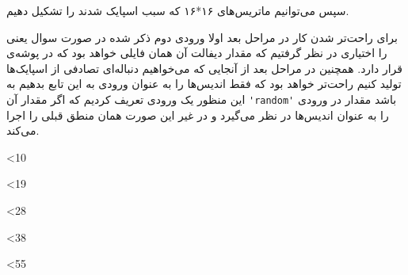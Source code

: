\documentclass[12pt,onecolumn,a4paper,fleqn]{article}
\begin{document}
سپس می‌توانیم ماتریس‌های ۱۶*۱۶ که سبب اسپایک شدند را تشکیل دهیم.

برای راحت‌تر شدن کار در مراحل بعد اولا ورودی دوم ذکر شده در صورت سوال یعنی  را اختیاری در نظر گرفتیم که مقدار دیفالت آن همان فایلی خواهد بود که در پوشه‌ی  قرار دارد. همچنین در مراحل بعد از آنجایی که می‌خواهیم دنباله‌ای تصادفی از اسپایک‌ها تولید کنیم راحت‌تر خواهد بود که فقط اندیس‌ها را به عنوان ورودی به این تابع بدهیم به این منظور یک ورودی  تعریف کردیم که اگر مقدار آن 
\lstinline[style=Matlab-editor, tabsize=2]{'random'}
باشد مقدار  در ورودی را به عنوان اندیس‌ها در نظر می‌گیرد و در غیر این صورت همان منطق قبلی را اجرا می‌کند.
		 
		 \setcounter{int}{1}
		 \loop
		 
		 \begin{figure}[h]
		 	\centering
			\hfill
		 \end{figure}
		 
		 
		 \addtocounter{int}{1}\ifnum\value{int}<10
		 \repeat
		 
		 \loop
		 
		 \begin{figure}[h]
		 	\centering
		 	\hfill
		 \end{figure}
		 
		 
		 \addtocounter{int}{1}\ifnum\value{int}<19
		 \repeat
		 
		 		 
		 \begin{figure}[h]
		 	\centering
		 	\hfill
		 \end{figure}
		 
		 
		 \addtocounter{int}{1}\ifnum\value{int}<28
		 \repeat
		 
		 \begin{figure}[h]
		 	\centering
		 	\hfill
		 \end{figure}
		 
		 
		 \addtocounter{int}{1}\ifnum\value{int}<38
		 \repeat

				 \begin{figure}[h]
			\centering
			\hfill
		\end{figure}
		
		
		\addtocounter{int}{1}\ifnum\value{int}<55
		\repeat
		
\end{document}
